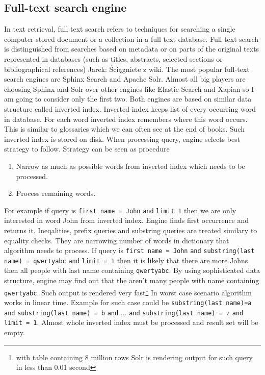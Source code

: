 \documentclass[10pt,a4paper]{article}
\newcommand{\jarek}[1]{\noindent\colorbox{myYellow}{Jarek: #1}}
\begin{document}
\subsection{Full-text search engine}
In text retrieval, full text search refers to techniques for searching a single computer-stored document or a collection in a full text database. Full text search is distinguished from searches based on metadata or on parts of the original texts represented in databases (such as titles, abstracts, selected sections or bibliographical references) \jarek{Ściągniete z wiki}. The most popular full-text search engines are Sphinx Search and Apache Solr. Almost all big players are choosing Sphinx and Solr over other engines like Elastic Search and Xapian so I am going to consider only the first two. Both engines are based on similar data structure called inverted index. Inverted index keeps list of every occurring word in database. For each word inverted index remembers where this word occurs. This is similar to glossaries which we can often see at the end of books. Such inverted index is stored on disk. When processing query, engine selects best strategy to follow. Strategy can be seen as procedure
\begin{enumerate}
\item Narrow as much as possible words from inverted index which needs to be processed. 
\item Process remaining words. 
\end{enumerate}
For example if query is \verb|first name = John| \verb|and| \verb|limit 1| then we are only interested in word John from inverted index. Engine finds first occurrence and returns it. Ineqalities, prefix queries and substring queries are treated similary to equality checks. They are narrowing number of words in dictionary that algorithm needs to process. If query is \verb|first name = John| \verb|and| \verb|substring(last name) = qwertyabc| \verb|and| \verb|limit = 1| then it is likely that there are more Johns then all people with last name containing \verb|qwertyabc|. By using sophisticated data structure, engine may find out that the aren't many people with name containing \verb|qwertyabc|. Such output is rendered very fast\footnote{with table containing 8 million rows Solr is rendering output for such query in less than 0.01 second} In worst case scenario algorithm works in linear time. Example for such case could be \verb|substring(last name)=a| \verb|and| \verb|substring(last name) = b| \verb|and| ... \verb|and| \verb|substring(last name) = z| \verb|and| \verb|limit = 1|. Almost whole inverted index must be processed and result set will be empty.
\end{document}
